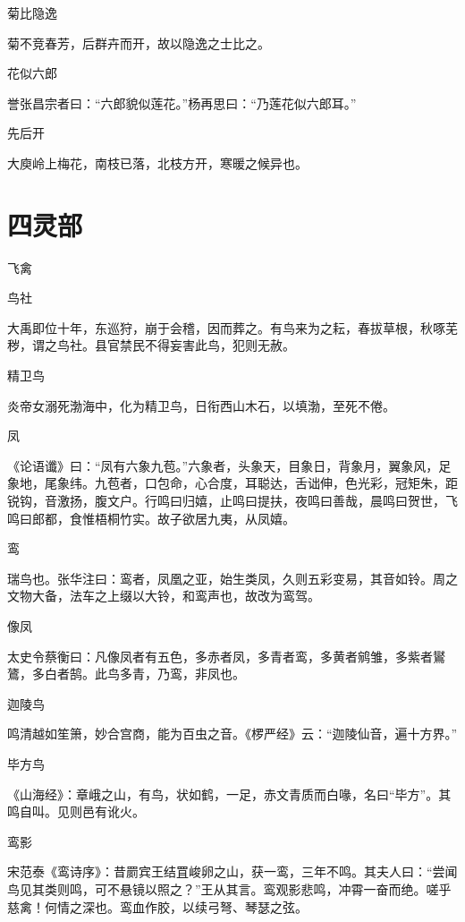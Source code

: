 \documentclass[a4paper,12pt,UTF8,twoside]{ctexbook}
\begin{document}
    菊比隐逸
    
    菊不竞春芳，后群卉而开，故以隐逸之士比之。
    
    花似六郎
    
    誉张昌宗者曰：“六郎貌似莲花。”杨再思曰：“乃莲花似六郎耳。”
    
    先后开
    
    大庾岭上梅花，南枝已落，北枝方开，寒暖之候异也。
    
    \part{四灵部}
    
    飞禽
    
    鸟社
    
    大禹即位十年，东巡狩，崩于会稽，因而葬之。有鸟来为之耘，春拔草根，秋啄芜秽，谓之鸟社。县官禁民不得妄害此鸟，犯则无赦。
    
    精卫鸟
    
    炎帝女溺死渤海中，化为精卫鸟，日衔西山木石，以填渤，至死不倦。
    
    凤
    
    《论语谶》曰：“凤有六象九苞。”六象者，头象天，目象日，背象月，翼象风，足象地，尾象纬。九苞者，口包命，心合度，耳聪达，舌诎伸，色光彩，冠矩朱，距锐钩，音激扬，腹文户。行鸣曰归嬉，止鸣曰提扶，夜鸣曰善哉，晨鸣曰贺世，飞鸣曰郎都，食惟梧桐竹实。故子欲居九夷，从凤嬉。
    
    鸾
    
    瑞鸟也。张华注曰：鸾者，凤凰之亚，始生类凤，久则五彩变易，其音如铃。周之文物大备，法车之上缀以大铃，和鸾声也，故改为鸾驾。
    
    像凤
    
    太史令蔡衡曰：凡像凤者有五色，多赤者凤，多青者鸾，多黄者鹓雏，多紫者鸑鷟，多白者鹄。此鸟多青，乃鸾，非凤也。
    
    迦陵鸟
    
    鸣清越如笙箫，妙合宫商，能为百虫之音。《椤严经》云：“迦陵仙音，遍十方界。”
    
    毕方鸟
    
    《山海经》：章峨之山，有鸟，状如鹤，一足，赤文青质而白喙，名曰“毕方”。其鸣自叫。见则邑有讹火。
    
    鸾影
    
    宋范泰《鸾诗序》：昔罽宾王结罝峻卵之山，获一鸾，三年不鸣。其夫人曰：“尝闻鸟见其类则鸣，可不悬镜以照之？”王从其言。鸾观影悲鸣，冲霄一奋而绝。嗟乎慈禽！何情之深也。鸾血作胶，以续弓弩、琴瑟之弦。
    
\end{document}
